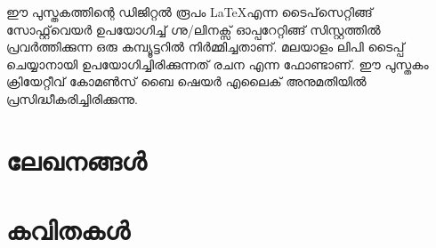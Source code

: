 \documentclass[12pt,a4paper,oneside]{book}
\renewcommand{\headrulewidth}{1pt}
\renewcommand{\footrulewidth}{1pt}
\begin{document}
\vfill
\noindent
ഈ പുസ്തകത്തിന്റെ ഡിജിറ്റൽ രൂപം \LaTeX എന്ന ടൈപ്‌സെറ്റിങ്ങ് സോഫ്റ്റ്‌വെയർ ഉപയോഗിച്ച് ഗ്നു/ലിനക്സ് ഓപ്പറേറ്റിങ്ങ് സിസ്റ്റത്തിൽ പ്രവർത്തിക്കുന്ന ഒരു കമ്പ്യൂട്ടറിൽ നിർമ്മിച്ചതാണ്. മലയാളം ലിപി ടൈപ്പ് ചെയ്യാനായി ഉപയോഗിച്ചിരിക്കുന്നത് രചന എന്ന ഫോണ്ടാണ്. ഈ പുസ്തകം ക്രിയേറ്റീവ് കോമൺസ് ബൈ ഷെയർ എലൈക് അനുമതിയിൽ പ്രസിദ്ധീകരിച്ചിരിക്കുന്നു.
\hypersetup{
    colorlinks,
    citecolor=black,
    filecolor=black,
    linkcolor=black,
    urlcolor=black
}
\newpage
\tableofcontents
\newpage
\renewcommand{\headrulewidth}{1pt}
\renewcommand{\footrulewidth}{1pt}
\onehalfspacing
\makeatletter
\renewcommand{\@chapapp}{ലേഖനം}
\part{ലേഖനങ്ങൾ}

\setcounter{page}{1} %






\makeatletter
\renewcommand{\@chapapp}{കവിത}
\makeatother
\part{കവിതകൾ}

\setcounter{page}{19}
\setcounter{chapter}{0}










\newpage
\pagecolor{Maroon}
\newpage\null\thispagestyle{empty}\newpage %
\end{document}
